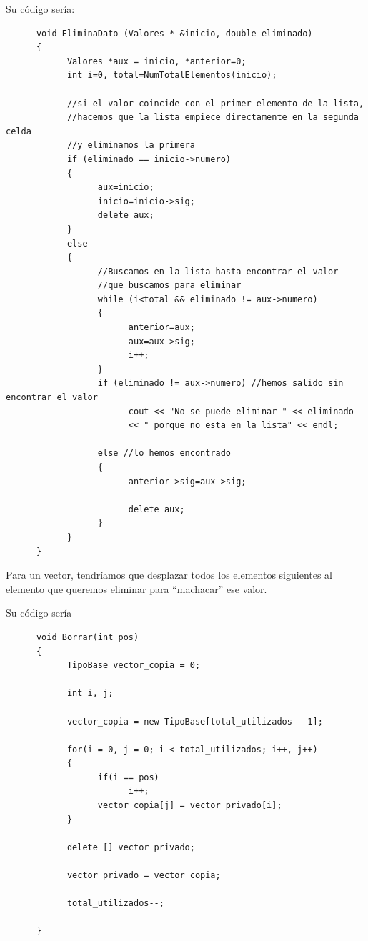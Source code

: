 \documentclass[10pt,a4paper,spanish]{report}
\begin{document}
                  \noindent
                  Su código sería:
      \begin{verbatim}
      void EliminaDato (Valores * &inicio, double eliminado)
      {
            Valores *aux = inicio, *anterior=0;
            int i=0, total=NumTotalElementos(inicio);

            //si el valor coincide con el primer elemento de la lista,
            //hacemos que la lista empiece directamente en la segunda celda
            //y eliminamos la primera
            if (eliminado == inicio->numero)
            {
                  aux=inicio;
                  inicio=inicio->sig;
                  delete aux;
            }
            else
            {
                  //Buscamos en la lista hasta encontrar el valor
                  //que buscamos para eliminar
                  while (i<total && eliminado != aux->numero)
                  {
                        anterior=aux;
                        aux=aux->sig;
                        i++;
                  }
                  if (eliminado != aux->numero) //hemos salido sin encontrar el valor
                        cout << "No se puede eliminar " << eliminado
                        << " porque no esta en la lista" << endl;

                  else //lo hemos encontrado
                  {
                        anterior->sig=aux->sig;

                        delete aux;
                  }
            }
      }
      \end{verbatim}

                  \noindent
                  Para un vector, tendríamos que desplazar todos los elementos siguientes al elemento que queremos eliminar para ``machacar'' ese valor.

                  \noindent
                  Su código sería
      \begin{verbatim}
      void Borrar(int pos)
      {
            TipoBase vector_copia = 0;

            int i, j;

            vector_copia = new TipoBase[total_utilizados - 1];

            for(i = 0, j = 0; i < total_utilizados; i++, j++)
            {
                  if(i == pos)
                        i++;
                  vector_copia[j] = vector_privado[i];
            }

            delete [] vector_privado;

            vector_privado = vector_copia;

            total_utilizados--;

      }
      \end{verbatim}
\end{document}
